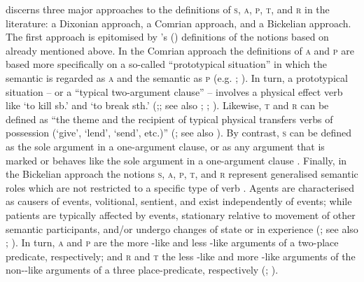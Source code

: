 \cite{haspelmath:2011a} discerns three major approaches to the definitions of \textsc{s}, \textsc{a}, \textsc{p}, \textsc{t}, and \textsc{r} in the literature: a Dixonian approach, a Comrian approach, and a Bickelian approach. The first approach is epitomised by \citeauthor{dixon:1972}’s (\citeyear{dixon:1972, dixon:1979, dixon:1994, dixon:2010a, dixon:2010b}) definitions of the notions based on  already mentioned above. In the Comrian approach the definitions of \textsc{a} and \textsc{p} are based more specifically on a so-called “prototypical  situation” in which the semantic  is regarded as \textsc{a} and the semantic  as \textsc{p} (e.g. \citealt[105]{comrie:1981}; \citeyear[11]{comrie:1989}). In turn, a prototypical  situation -- or a “typical two-argument clause” -- involves a physical effect verb like ‘to kill sb.’ and ‘to break sth.’ (\citealt[545ff.]{haspelmath:2011a};; see also \citealt{andrews:1985, andrews:2007}; \citealt{lazard:2002}; \citealt{creissels:2006}). Likewise, \textsc{t} and \textsc{r} can be defined as “the theme and the recipient of typical physical transfers verbs of possession (‘give’, ‘lend’, ‘send’, etc.)” (\citealt[558]{haspelmath:2011a}; see also \citealt{malchukov:al:2010}). By contrast, \textsc{s} can be defined as the sole argument in a one-argument clause, or as any argument that is marked or behaves like the sole argument in a one-argument clause \citep[549f.]{haspelmath:2011a}. Finally, in the Bickelian approach the notions \textsc{s}, \textsc{a}, \textsc{p}, \textsc{t}, and \textsc{r} represent generalised semantic roles which are not restricted to a specific type of verb \citep{nichols:2008, bickel:nichols:2009, bickel:al:2010, bickel:2011, witzlack-makarevich:2011}. Agents are characterised as causers of events, volitional, sentient, and exist independently of events; while patients are typically affected by events, stationary relative to movement of other semantic participants, and/or undergo changes of state or in experience (\citealt[554]{haspelmath:2011a}; see also \citealt{dowty:1991}; \citealt[384]{bickel:al:2010}). In turn, \textsc{a} and \textsc{p} are the more -like and less -like arguments of a two-place predicate, respectively; and \textsc{r} and \textsc{t} the less -like and more -like arguments of the non--like arguments of a three place-predicate, respectively (\citealt[307]{bickel:nichols:2009}; \citealt[384]{bickel:al:2010}). 

